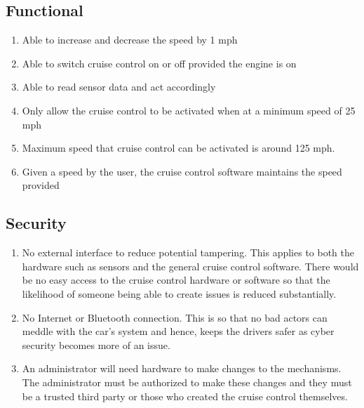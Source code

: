 \documentclass[preprint,11pt,3p]{article}
\begin{document}
\subsection{Functional}
\begin{enumerate}
	\item Able to increase and decrease the speed by 1 mph
	\item Able to switch cruise control on or off provided the engine is on
	\item Able to read sensor data and act accordingly %
	\item Only allow the cruise control to be activated when at a minimum speed of 25 mph %
	\item Maximum speed that cruise control can be activated is around 125 mph. 
	\item Given a speed by the user, the cruise control software maintains the speed provided
\end{enumerate}

\subsection{Security}
\begin{enumerate}
	\item No external interface to reduce potential tampering. This applies to both the hardware such as sensors and the general cruise control software. There would be no easy access to the cruise control hardware or software so that the likelihood of someone being able to create issues is reduced substantially. 
	\item No Internet or Bluetooth connection. This is so that no bad actors can meddle with the car's system and hence, keeps the drivers safer as cyber security becomes more of an issue.
	\item An administrator will need hardware to make changes to the mechanisms. The administrator must be authorized to make these changes and they must be a trusted third party or those who created the cruise control themselves. 
\end{enumerate}
\end{document}
